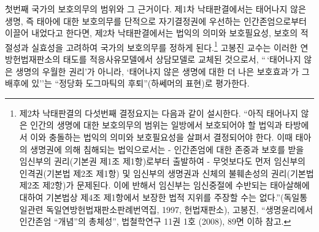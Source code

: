 첫번째 국가의 보호의무의 범위와 그 근거이다. 제1차 낙태판결에서는 태어나지 않은 생명, 즉 태아에 대한 보호의무를 단적으로 자기결정권에 우선하는 인간존엄으로부터 이끌어 내었다고 한다면, 제2차 낙태판결에서는 법익의 의미와 보호필요성, 보호의 적절성과 실효성을 고려하여 국가의 보호의무를 정하게 된다.\footnote{제2차 낙태판결의 다섯번째 결정요지는 다음과 같이 설시한다. ``아직 태어나지 않은 인간의 생명에 대한 보호의무의 범위는 일방에서 보호되어야 할 법익과 타방에서 이와 충돌하는 법익의 의미와 보호필요성을 살펴서 결정되어야 한다. 이때 태아의 생명권에 의해 침해되는 법익으로서는 - 인간존엄에 대한 존중과 보호를 받을 임신부의 권리(기본권 제1조 제1항)로부터 출발하여 - 무엇보다도 먼저 임신부의 인격권(기본법 제2조 제1항) 및 임신부의 생명권과 신체의 불훼손성의 권리(기본법 제2조 제2항)가 문제된다. 이에 반해서 임신부는 임신중절에 수반되는 태아살해에 대하여 기본법상 제4조 제1항에서 보장한 법적 지위를 주장할 수는 없다.''(독일통일관련 독일연방헌법재판소판례번역집, 1997, 헌법재판소), 고봉진, ``생명윤리에서 인간존엄 ``개념''의 총체성'', 법철학연구 11권 1호 (2008), 89면 이하 참고.} 고봉진 교수는 이러한 연방헌법재판소의 태도를 적응사유모델에서 상담모델로 교체된 것으로서, ``\,`태어나지 않은 생명의 우월한 권리'가 아니라, `태어나지 않은 생명에 대한 더 나은 보호효과'가 그 배후에 있''는 ``정당화 도그마틱의 후퇴''(하쎄머의 표현)로 평가한다.

